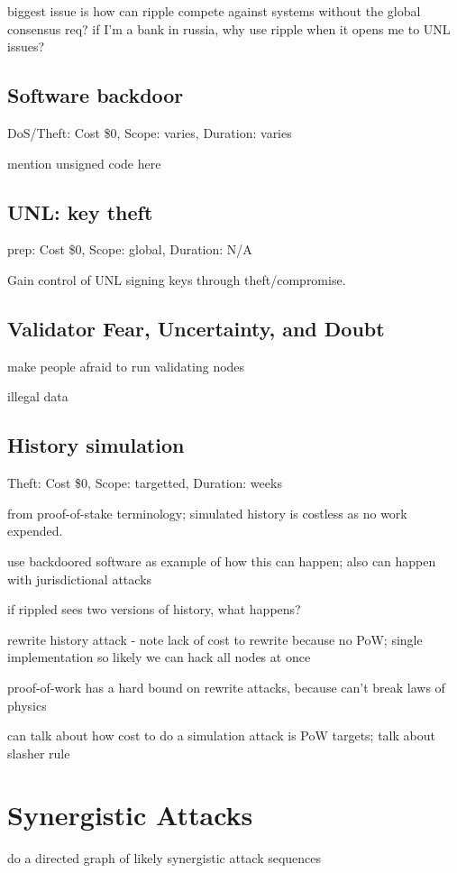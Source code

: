 \documentclass{article}
\begin{document}
biggest issue is how can ripple compete against systems without the global
consensus req? if I'm a bank in russia, why use ripple when it opens me to UNL
issues?


\subsection{Software backdoor}

DoS/Theft: Cost \$0, Scope: varies, Duration: varies

mention unsigned code here


\subsection{UNL: key theft}

prep: Cost \$0, Scope: global, Duration: N/A

Gain control of UNL signing keys through theft/compromise. 


\subsection{Validator Fear, Uncertainty, and Doubt}

make people afraid to run validating nodes

illegal data


\subsection{History simulation}

Theft: Cost \$0, Scope: targetted, Duration: weeks

from proof-of-stake terminology; simulated history is costless as no work
expended.

use backdoored software as example of how this can happen; also can happen with
jurisdictional attacks

if rippled sees two versions of history, what happens?

rewrite history attack - note lack of cost to rewrite because no PoW; single
implementation so likely we can hack all nodes at once

proof-of-work has a hard bound on rewrite attacks, because can't break laws of
physics

can talk about how cost to do a simulation attack is PoW targets; talk about slasher rule


\section{Synergistic Attacks}

do a directed graph of likely synergistic attack sequences




\end{document}
